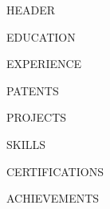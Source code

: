 \documentclass[letterpaper,11pt]{article}
\begin{document}
{{HEADER}}

{{EDUCATION}}

{{EXPERIENCE}}

{{PATENTS}}

{{PROJECTS}}

{{SKILLS}}

{{CERTIFICATIONS}}

{{ACHIEVEMENTS}}
\end{document}
